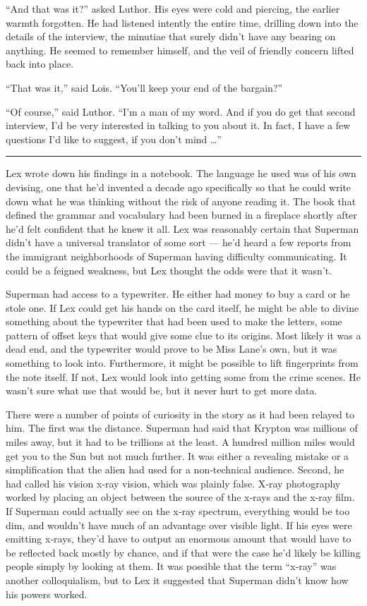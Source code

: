``And that was it?'' asked Luthor. His eyes were cold and piercing, the
earlier warmth forgotten. He had listened intently the entire time,
drilling down into the details of the interview, the minutiae that
surely didn't have any bearing on anything. He seemed to remember
himself, and the veil of friendly concern lifted back into place.

``That was it,'' said Lois. ``You'll keep your end of the bargain?''

``Of course,'' said Luthor. ``I'm a man of my word. And if you do get
that second interview, I'd be very interested in talking to you about
it. In fact, I have a few questions I'd like to suggest, if you don't
mind \ldots{}''

\begin{center}\rule{0.5\linewidth}{\linethickness}\end{center}

Lex wrote down his findings in a notebook. The language he used was of
his own devising, one that he'd invented a decade ago specifically so
that he could write down what he was thinking without the risk of anyone
reading it. The book that defined the grammar and vocabulary had been
burned in a fireplace shortly after he'd felt confident that he knew it
all. Lex was reasonably certain that Superman didn't have a universal
translator of some sort --- he'd heard a few reports from the immigrant
neighborhoods of Superman having difficulty communicating. It could be a
feigned weakness, but Lex thought the odds were that it wasn't.

Superman had access to a typewriter. He either had money to buy a card
or he stole one. If Lex could get his hands on the card itself, he might
be able to divine something about the typewriter that had been used to
make the letters, some pattern of offset keys that would give some clue
to its origins. Most likely it was a dead end, and the typewriter would
prove to be Miss Lane's own, but it was something to look into.
Furthermore, it might be possible to lift fingerprints from the note
itself. If not, Lex would look into getting some from the crime scenes.
He wasn't sure what use that would be, but it never hurt to get more
data.

There were a number of points of curiosity in the story as it had been
relayed to him. The first was the distance. Superman had said that
Krypton was millions of miles away, but it had to be trillions at the
least. A hundred million miles would get you to the Sun but not much
further. It was either a revealing mistake or a simplification that the
alien had used for a non‐technical audience. Second, he had called his
vision x‐ray vision, which was plainly false. X‐ray photography worked
by placing an object between the source of the x‐rays and the x‐ray
film. If Superman could actually see on the x‐ray spectrum, everything
would be too dim, and wouldn't have much of an advantage over visible
light. If his eyes were emitting x‐rays, they'd have to output an
enormous amount that would have to be reflected back mostly by chance,
and if that were the case he'd likely be killing people simply by
looking at them. It was possible that the term ``x‐ray'' was another
colloquialism, but to Lex it suggested that Superman didn't know how his
powers worked.

